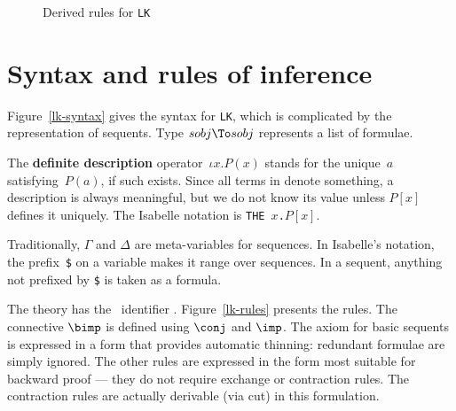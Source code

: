 \begin{figure} 

\caption{Derived rules for {\tt LK}} \label{lk-derived}
\end{figure}


\section{Syntax and rules of inference}
Figure~\ref{lk-syntax} gives the syntax for {\tt LK}, which is complicated
by the representation of sequents.  Type $sobj\To sobj$ represents a list
of formulae.

The {\bf definite description} operator~$\iota x.P(x)$ stands for the
unique~$a$ satisfying~$P(a)$, if such exists.  Since all terms in \LK{}
denote something, a description is always meaningful, but we do not know
its value unless $P[x]$ defines it uniquely.  The Isabelle notation is
\hbox{\tt THE $x$.$P[x]$}.

Traditionally, \(\Gamma\) and \(\Delta\) are meta-variables for sequences.
In Isabelle's notation, the prefix~\verb|$| on a variable makes it range
over sequences.  In a sequent, anything not prefixed by \verb|$| is taken
as a formula.

The theory has the \ML\ identifier .
Figure~\ref{lk-rules} presents the rules.  The connective $\bimp$ is
defined using $\conj$ and $\imp$.  The axiom for basic sequents is
expressed in a form that provides automatic thinning: redundant formulae
are simply ignored.  The other rules are expressed in the form most
suitable for backward proof --- they do not require exchange or contraction
rules.  The contraction rules are actually derivable (via cut) in this
formulation.

